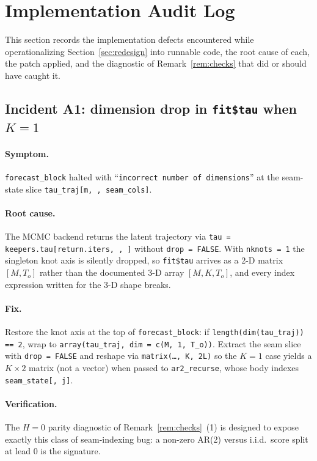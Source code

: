 \documentclass[11pt]{article}
\theoremstyle{definition}
\theoremstyle{remark}
\begin{document}
\section{Implementation Audit Log}
\label{sec:audit}

This section records the implementation defects encountered while
operationalizing Section~\ref{sec:redesign} into runnable code, the
root cause of each, the patch applied, and the diagnostic of
Remark~\ref{rem:checks} that did or should have caught it.

\subsection{Incident A1: dimension drop in \texttt{fit\$tau} when $K=1$}
\label{sec:audit-dim}

\paragraph{Symptom.}
\texttt{forecast\_block} halted with ``\texttt{incorrect number of
dimensions}'' at the seam-state slice
\texttt{tau\_traj[m, , seam\_cols]}.

\paragraph{Root cause.}
The MCMC backend returns the latent trajectory via
\texttt{tau = keepers.tau[return.iters, , ]} without
\texttt{drop = FALSE}. With \texttt{nknots = 1} the singleton knot
axis is silently dropped, so \texttt{fit\$tau} arrives as a 2-D
matrix $[M, T_o]$ rather than the documented 3-D array
$[M, K, T_o]$, and every index expression written for the 3-D shape
breaks.

\paragraph{Fix.}
Restore the knot axis at the top of \texttt{forecast\_block}: if
\texttt{length(dim(tau\_traj)) == 2}, wrap to
\texttt{array(tau\_traj, dim = c(M, 1, T\_o))}. Extract the seam
slice with \texttt{drop = FALSE} and reshape via
\texttt{matrix(\dots, K, 2L)} so the $K = 1$ case yields a
$K \times 2$ matrix (not a vector) when passed to
\texttt{ar2\_recurse}, whose body indexes \texttt{seam\_state[, j]}.

\paragraph{Verification.}
The $H = 0$ parity diagnostic of Remark~\ref{rem:checks}~(1) is
designed to expose exactly this class of seam-indexing bug: a
non-zero AR(2) versus i.i.d.\ score split at lead $0$ is the
signature.
\end{document}
